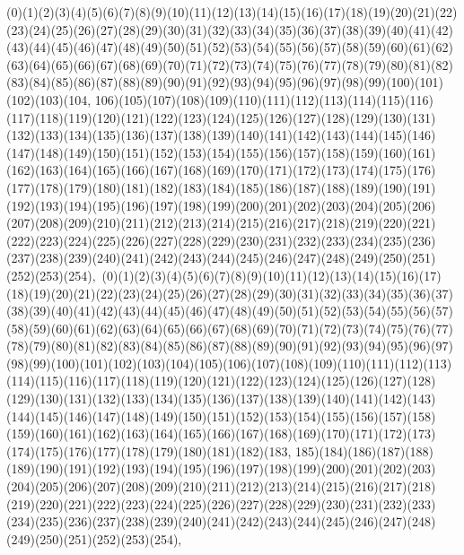 \documentclass[12pt]{article}
\begin{document}
{(0)(1)(2)(3)(4)(5)(6)(7)(8)(9)(10)(11)(12)(13)(14)(15)(16)(17)(18)(19)(20)(21)(22)(23)(24)(25)(26)(27)(28)(29)(30)(31)(32)(33)(34)(35)(36)(37)(38)(39)(40)(41)(42)(43)(44)(45)(46)(47)(48)(49)(50)(51)(52)(53)(54)(55)(56)(57)(58)(59)(60)(61)(62)(63)(64)(65)(66)(67)(68)(69)(70)(71)(72)(73)(74)(75)(76)(77)(78)(79)(80)(81)(82)(83)(84)(85)(86)(87)(88)(89)(90)(91)(92)(93)(94)(95)(96)(97)(98)(99)(100)(101)(102)(103)(104, 106)(105)(107)(108)(109)(110)(111)(112)(113)(114)(115)(116)(117)(118)(119)(120)(121)(122)(123)(124)(125)(126)(127)(128)(129)(130)(131)(132)(133)(134)(135)(136)(137)(138)(139)(140)(141)(142)(143)(144)(145)(146)(147)(148)(149)(150)(151)(152)(153)(154)(155)(156)(157)(158)(159)(160)(161)(162)(163)(164)(165)(166)(167)(168)(169)(170)(171)(172)(173)(174)(175)(176)(177)(178)(179)(180)(181)(182)(183)(184)(185)(186)(187)(188)(189)(190)(191)(192)(193)(194)(195)(196)(197)(198)(199)(200)(201)(202)(203)(204)(205)(206)(207)(208)(209)(210)(211)(212)(213)(214)(215)(216)(217)(218)(219)(220)(221)(222)(223)(224)(225)(226)(227)(228)(229)(230)(231)(232)(233)(234)(235)(236)(237)(238)(239)(240)(241)(242)(243)(244)(245)(246)(247)(248)(249)(250)(251)(252)(253)(254)$
, 
$
(0)(1)(2)(3)(4)(5)(6)(7)(8)(9)(10)(11)(12)(13)(14)(15)(16)(17)(18)(19)(20)(21)(22)(23)(24)(25)(26)(27)(28)(29)(30)(31)(32)(33)(34)(35)(36)(37)(38)(39)(40)(41)(42)(43)(44)(45)(46)(47)(48)(49)(50)(51)(52)(53)(54)(55)(56)(57)(58)(59)(60)(61)(62)(63)(64)(65)(66)(67)(68)(69)(70)(71)(72)(73)(74)(75)(76)(77)(78)(79)(80)(81)(82)(83)(84)(85)(86)(87)(88)(89)(90)(91)(92)(93)(94)(95)(96)(97)(98)(99)(100)(101)(102)(103)(104)(105)(106)(107)(108)(109)(110)(111)(112)(113)(114)(115)(116)(117)(118)(119)(120)(121)(122)(123)(124)(125)(126)(127)(128)(129)(130)(131)(132)(133)(134)(135)(136)(137)(138)(139)(140)(141)(142)(143)(144)(145)(146)(147)(148)(149)(150)(151)(152)(153)(154)(155)(156)(157)(158)(159)(160)(161)(162)(163)(164)(165)(166)(167)(168)(169)(170)(171)(172)(173)(174)(175)(176)(177)(178)(179)(180)(181)(182)(183, 185)(184)(186)(187)(188)(189)(190)(191)(192)(193)(194)(195)(196)(197)(198)(199)(200)(201)(202)(203)(204)(205)(206)(207)(208)(209)(210)(211)(212)(213)(214)(215)(216)(217)(218)(219)(220)(221)(222)(223)(224)(225)(226)(227)(228)(229)(230)(231)(232)(233)(234)(235)(236)(237)(238)(239)(240)(241)(242)(243)(244)(245)(246)(247)(248)(249)(250)(251)(252)(253)(254)$
, 
$
}
\end{document}
